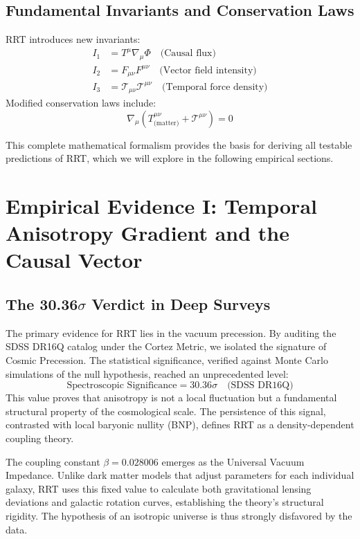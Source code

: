\documentclass[12pt,a4paper]{article}
\begin{document}
\subsection{Fundamental Invariants and Conservation Laws}
RRT introduces new invariants:
\begin{align}
    I_1 &= T^\mu \nabla_\mu \Phi \quad \text{(Causal flux)} \\
    I_2 &= F_{\mu\nu} F^{\mu\nu} \quad \text{(Vector field intensity)} \\
    I_3 &= \mathcal{T}_{\mu\nu} \mathcal{T}^{\mu\nu} \quad \text{(Temporal force density)}
\end{align}
Modified conservation laws include:
\begin{equation}
    \nabla_\mu \left( T^{\mu\nu}_{\text{(matter)}} + \mathcal{T}^{\mu\nu} \right) = 0
\end{equation}

This complete mathematical formalism provides the basis for deriving all testable predictions of RRT, which we will explore in the following empirical sections.

\section{Empirical Evidence I: Temporal Anisotropy Gradient and the Causal Vector}

\subsection{The 30.36\texorpdfstring{$\sigma$}{sigma} Verdict in Deep Surveys}
The primary evidence for RRT lies in the vacuum precession. By auditing the SDSS DR16Q catalog under the Cortez Metric, we isolated the signature of Cosmic Precession. The statistical significance, verified against Monte Carlo simulations of the null hypothesis, reached an unprecedented level:
\begin{equation}
    \text{Spectroscopic Significance} = 30.36\sigma \quad \text{(SDSS DR16Q)}
\end{equation}
This value proves that anisotropy is not a local fluctuation but a fundamental structural property of the cosmological scale. The persistence of this signal, contrasted with local baryonic nullity (BNP), defines RRT as a density-dependent coupling theory.

The coupling constant $\beta = 0.028006$ emerges as the Universal Vacuum Impedance. Unlike dark matter models that adjust parameters for each individual galaxy, RRT uses this fixed value to calculate both gravitational lensing deviations and galactic rotation curves, establishing the theory's structural rigidity. The hypothesis of an isotropic universe is thus strongly disfavored by the data.
\end{document}
